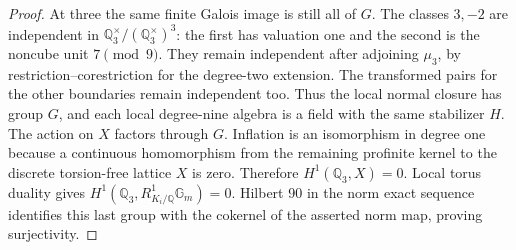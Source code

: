 \begin{proof}
At three the same finite Galois image is still all of $G$.
The classes $3,-2$ are independent in
$\mathbb Q_3^\times/(\mathbb Q_3^\times)^3$: the first has valuation
one and the second is the noncube unit $7\pmod9$.
They remain independent after adjoining $\mu_3$, by
restriction--corestriction for the degree-two extension. The
transformed pairs for the other boundaries remain independent too.
Thus the local normal closure has group $G$, and each local degree-nine
algebra is a field with the same stabilizer $H$.
The action on $X$ factors through $G$. Inflation is an isomorphism
in degree one because a continuous homomorphism from the remaining
profinite kernel to the discrete torsion-free lattice $X$ is zero.
Therefore $H^1(\mathbb Q_3,X)=0$.
Local torus duality
\citep[I.2.4, pp.~28--29]{CohMilneADT} gives
$H^1(\mathbb Q_3,R^1_{K_i/\mathbb Q}\mathbb G_m)=0$.
Hilbert 90 in the norm exact sequence identifies this last group
with the cokernel of the asserted norm map, proving surjectivity.
\end{proof}

